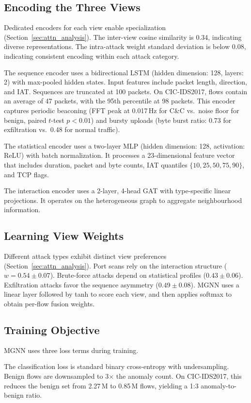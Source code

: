\documentclass[conference]{IEEEtran}
\begin{document}
\subsection{Encoding the Three Views}
Dedicated encoders for each view enable specialization (Section~\ref{sec:attn_analysis}). The inter-view cosine similarity is 0.34, indicating diverse representations. The intra-attack weight standard deviation is below 0.08, indicating consistent encoding within each attack category.

The sequence encoder uses a bidirectional LSTM (hidden dimension: 128, layers: 2) with max-pooled hidden states. Input features include packet length, direction, and IAT. Sequences are truncated at 100 packets. On CIC-IDS2017, flows contain an average of 47 packets, with the 95th percentile at 98 packets. This encoder captures periodic beaconing (FFT peak at 0.017\,Hz for C\&C vs.\ noise floor for benign, paired $t$-test $p<0.01$) and bursty uploads (byte burst ratio: 0.73 for exfiltration vs.\ 0.48 for normal traffic).

The statistical encoder uses a two-layer MLP (hidden dimension: 128, activation: ReLU) with batch normalization. It processes a 23-dimensional feature vector that includes duration, packet and byte counts, IAT quantiles $\{10,25,50,75,90\}$, and TCP flags.

The interaction encoder uses a 2-layer, 4-head GAT with type-specific linear projections. It operates on the heterogeneous graph to aggregate neighbourhood information.

\subsection{Learning View Weights}
Different attack types exhibit distinct view preferences (Section~\ref{sec:attn_analysis}). Port scans rely on the interaction structure ($w=0.54\pm0.07$). Brute-force attacks depend on statistical profiles ($0.43\pm0.06$). Exfiltration attacks favor the sequence asymmetry ($0.49\pm0.08$). MGNN uses a linear layer followed by tanh to score each view, and then applies softmax to obtain per-flow fusion weights.

\subsection{Training Objective}
MGNN uses three loss terms during training.

The classification loss is standard binary cross-entropy with undersampling. Benign flows are downsampled to 3$\times$ the anomaly count. On CIC-IDS2017, this reduces the benign set from 2.27\,M to 0.85\,M flows, yielding a 1:3 anomaly-to-benign ratio.
\end{document}
